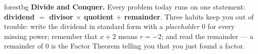 \documentclass[10pt]{article}
\begin{document}
\namepartnerperiod

\vspace{0.08in}

\begin{headlinebox}{forestbg}
\small\textbf{Divide and Conquer.} Every problem today runs on one statement:
\textbf{dividend $=$ divisor $\times$ quotient $+$ remainder}. Three habits keep you out of trouble:
write the dividend in standard form with a \emph{placeholder $0$} for every missing power; remember
that $x + 2$ means $r = -2$; and read the remainder --- a remainder of $0$ is the Factor Theorem
telling you that you just found a factor.
\end{headlinebox}

\vspace{0.06in}
\end{document}
